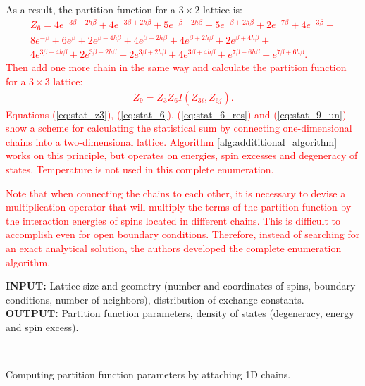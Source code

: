 \documentclass[preprint,12pt]{elsarticle}
\begin{document}
	As a result, the partition function for a $3 \times 2$ lattice is:
	\textcolor{red}{
	\begin{equation}
		\label{eq:stat_6_res}
		\begin{alignedat}{3}
			Z_6 = 4 e^{ - 3 \beta-2 h\beta} + 4 e^{- 3 \beta+2 h\beta} + 5 e^{- \beta-2 h\beta } + 5 e^{- \beta+2 h\beta } + 2 e^{-7 \beta} + 4 e^{-3 \beta} + \\
			8 e^{-\beta} + 6 e^{\beta} + 2 e^{\beta-4 h\beta } + 4 e^{\beta-2 h\beta } + 4 e^{\beta+2 h\beta } + 2 e^{\beta+4 h\beta } + \\
			4 e^{3 \beta-4 h\beta } + 2 e^{3 \beta-2 h\beta } + 2 e^{3 \beta+2 h\beta } + 4 e^{3 \beta+4 h\beta } + e^{7 \beta-6 h\beta } + e^{7 \beta+6 h\beta }.
		\end{alignedat}
	\end{equation}
}
\textcolor{red}{Then add one more chain in the same way and calculate the partition function for a $3 \times 3$ lattice:}
\textcolor{red}{
\begin{equation}
	\label{eq:stat_9_un}
	\begin{alignedat}{2}
		Z_9 =  Z_{3}Z_{6}I(Z_{3i},Z_{6j}).
	\end{alignedat}
\end{equation}
}
	\textcolor{red}{Equations (\ref{eq:stat_z3}), (\ref{eq:stat_6}), (\ref{eq:stat_6_res}) and  (\ref{eq:stat_9_un}) show a scheme for calculating the statistical sum by connecting one-dimensional chains into a two-dimensional lattice. Algorithm \ref{alg:addititional_algorithm} \cite{trukhin2024glaurung} works on this principle, but operates on energies, spin excesses and degeneracy of states. Temperature is not used in this complete enumeration.}
	
	\textcolor{red}{Note that when connecting the chains to each other, it is necessary to devise a multiplication operator that will multiply the terms of the partition function by the interaction energies of spins located in different chains. This is difficult to accomplish even for open boundary conditions. Therefore, instead of searching for an exact analytical solution, the authors developed the complete enumeration algorithm.}
	
	
	\begin{algorithm}[H]
		\textbf{INPUT:} Lattice size and geometry (number and coordinates of spins, boundary conditions, number of neighbors), distribution of exchange constants.\\
		\textbf{OUTPUT:} Partition function parameters, density of states (degeneracy, energy and spin excess).
		\begin{algorithmic}
			{
				{
				}
				\ENDFOR \\
			}
			\ENDFOR
		\end{algorithmic}
		\caption{Computing partition function parameters by attaching 1D chains.}
		\label{alg:addititional_algorithm}
	\end{algorithm}
	
\end{document}
